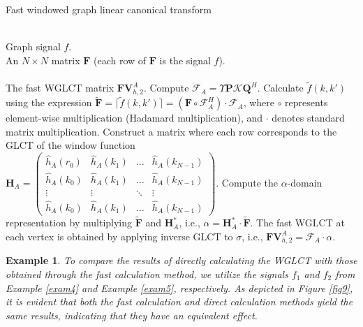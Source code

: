 \documentclass[lettersize,journal]{IEEEtran}
\newtheorem{example}{Example}
\begin{document}
\begin{algorithm}[!h]
	\caption{Fast windowed graph linear canonical transform}%
	\begin{algorithmic}[1]%
		\REQUIRE ~~\\
		Graph signal $f$. \\
		An $N\times N$ matrix $\mathbf{F}$ (each row of $\mathbf{F}$ is the signal $f$).\\
		\ENSURE ~~\\
		The fast WGLCT matrix $\mathbf{FV}_{h,2}^A$.
		\STATE Compute $\mathcal{F}_{A} =  \Upsilon \mathbf{P} \mathcal{K} \mathbf{Q}^H$.
		\STATE Calculate $\tilde{f}(k,k')$ using the expression $\tilde{\mathbf{F}} = \lceil \tilde{f}(k,k') \rceil = (\mathbf{F} \circ \mathcal{F}_{A}^H) \cdot \mathcal{F}_{A}$, where $\circ$ represents element-wise multiplication (Hadamard multiplication), and $\cdot$ denotes standard matrix multiplication.
		\STATE Construct a matrix where each row corresponds to the GLCT of the window function \\
		$\mathbf{H}_A=\left(\begin{array}{cccc}\hat{h}_A\left(r_0\right) & \hat{h}_A\left(k_1\right) & \ldots & \hat{h}_A\left(k_{N-1}\right) \\ \hat{h}_A\left(k_0\right) & \hat{h}_A\left(k_1\right) & \ldots & \hat{h}_A\left(k_{N-1}\right) \\ \vdots & \vdots & \ddots & \vdots \\ \hat{h}_A\left(k_0\right) & \hat{h}_A\left(k_1\right) & \ldots & \hat{h}_A\left(k_{N-1}\right)\end{array}\right)$.
		\STATE Compute the $\alpha$-domain representation by multiplying $\tilde{\mathbf{F}}$ and $\mathbf{H}_A^*$, i.e., $\alpha = \mathbf{H}_A^* \cdot \tilde{\mathbf{F}}$.
		\STATE The fast WGLCT at each vertex is obtained by applying inverse GLCT to $\sigma$, i.e., $\mathbf{FV}_{h,2}^A = \mathcal{F}_{A} \cdot \alpha$.
	\end{algorithmic}
\end{algorithm}

\begin{example}
	To compare the results of directly calculating the WGLCT with those obtained through the fast calculation method, we utilize the signals $f_1$ and $f_2$ from Example \ref{exam4} and Example \ref{exam5}, respectively. As depicted in Figure \ref{fig9}, it is evident that both the fast calculation and direct calculation methods yield the same results, indicating that they have an equivalent effect.
\end{example}
\end{document}
